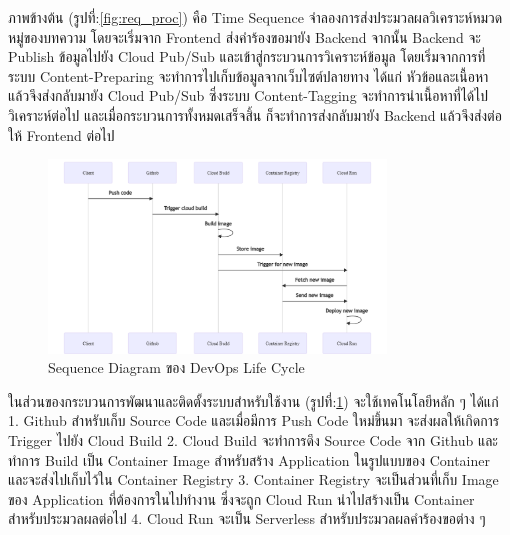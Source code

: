 \documentclass[12pt,oneside,openright,a4paper]{cpe-thai-project}
\begin{document}
\begin{itemize}
  \hspace{1cm}ภาพข้างต้น (รูปที่:\ref{fig:req_proc}) คือ Time Sequence จำลองการส่งประมวลผลวิเคราะห์หมวดหมู่ของบทความ โดยจะเริ่มจาก Frontend ส่งคำร้องขอมายัง Backend 
  จากนั้น Backend จะ Publish ข้อมูลไปยัง Cloud Pub/Sub และเข้าสู่กระบวนการวิเคราะห์ข้อมูล โดยเริ่มจากการที่ระบบ Content-Preparing จะทำการไปเก็บข้อมูลจากเว็บไซต์ปลายทาง 
  ได้แก่ หัวข้อและเนื้อหา แล้วจึงส่งกลับมายัง Cloud Pub/Sub ซึ่งระบบ Content-Tagging จะทำการนำเนื้อหาที่ได้ไปวิเคราะห์ต่อไป และเมื่อกระบวนการทั้งหมดเสร็จสิ้น ก็จะทำการส่งกลับมายัง Backend 
  แล้วจึงส่งต่อให้ Frontend ต่อไป
  \newpage
  \begin{figure}[!ht]\centering
    \includegraphics[width=0.8\textwidth]{./img/devops.png}
    \caption{Sequence Diagram ของ DevOps Life Cycle}\label{fig:devops} 
  \end{figure}
  
  ในส่วนของกระบวนการพัฒนาและติดตั้งระบบสำหรับใช้งาน (รูปที่:\ref{fig:devops}) จะใช้เทคโนโลยีหลัก ๆ ได้แก่ 
  \newline\hspace*{0.5cm} 1. Github สำหรับเก็บ Source Code และเมื่อมีการ Push Code ใหม่ขึ้นมา จะส่งผลให้เกิดการ Trigger ไปยัง Cloud Build
  \newline\hspace*{0.5cm} 2. Cloud Build จะทำการดึง Source Code จาก Github และทำการ Build เป็น Container Image สำหรับสร้าง Application ในรูปแบบของ Container และจะส่งไปเก็บไว้ใน Container Registry
  \newline\hspace*{0.5cm} 3. Container Registry จะเป็นส่วนที่เก็บ Image ของ Application ที่ต้องการในไปทำงาน ซึ่งจะถูก Cloud Run นำไปสร้างเป็น Container สำหรับประมวลผลต่อไป
  \newline\hspace*{0.5cm} 4. Cloud Run จะเป็น Serverless สำหรับประมวลผลคำร้องขอต่าง ๆ 
  

\end{itemize}
\end{document}
